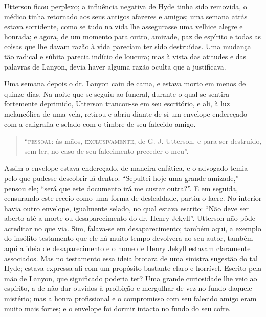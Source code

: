 Utterson ficou perplexo; a influência negativa de Hyde tinha sido
removida, o médico tinha retornado aos seus antigos afazeres e amigos;
uma semana atrás estava sorridente, como se tudo na vida lhe
assegurasse uma velhice alegre e honrada; e agora, de um momento para
outro, amizade, paz de espírito e todas as coisas que lhe davam razão à
vida pareciam ter sido destruídas.  Uma mudança tão radical e súbita
parecia indício de loucura; mas à vista das atitudes e das palavras de
Lanyon, devia haver alguma razão oculta que a justificava.

Uma semana depois o dr. Lanyon caiu de cama, e estava morto em menos de
quinze dias.  Na noite que se seguiu ao funeral, durante o qual se
sentira fortemente deprimido, Utterson trancou-se em seu
escritório, e ali, à luz melancólica de uma vela, retirou e abriu
diante de si um envelope endereçado com a caligrafia e selado com o
timbre de seu falecido amigo.  

\begin{quote}
“\textsc{pessoal}: às mãos, \textsc{exclusivamente}, de G. J. Utterson, e para ser
destruído, sem ler, no caso de seu falecimento preceder o meu”.
\end{quote}

Assim o envelope estava endereçado, de maneira enfática, e o advogado
temia pelo que pudesse descobrir lá dentro.  “Sepultei hoje uma grande
amizade,” pensou ele; “será que este documento irá me custar outra?”. 
E em seguida, censurando este receio como uma forma de deslealdade, 
partiu o lacre.  No interior havia outro envelope, igualmente selado,
no qual estava escrito: “Não deve ser aberto até a morte ou
desaparecimento do dr. Henry Jekyll”.  Utterson não pôde acreditar no
que via.  Sim, falava-se em desaparecimento; também aqui, a exemplo do
insólito testamento que ele há muito tempo devolvera ao seu autor,
também aqui a ideia de desaparecimento e o nome de Henry Jekyll estavam
claramente associados.  Mas no testamento essa ideia brotara de uma
sinistra sugestão do tal Hyde; estava expressa ali com um propósito
bastante claro e horrível.  Escrito pela mão de Lanyon, que significado
poderia ter?  Uma grande curiosidade lhe veio ao espírito, a de não dar
ouvidos à proibição e mergulhar de vez no fundo daquele mistério; mas a
honra profissional e o compromisso com seu falecido amigo eram
muito mais fortes; e o envelope foi dormir intacto no
fundo do seu cofre.

